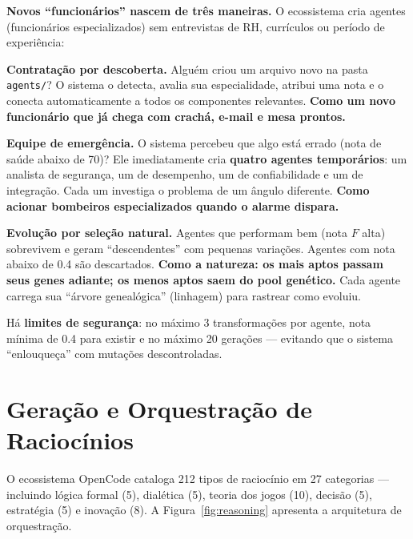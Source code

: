 \documentclass[
  article,
  12pt,
  oneside,
  a4paper,
  brazil,
  sumario=tradicional
]{abntex2}
\begin{document}
\begin{leigosbox}
\textbf{Novos ``funcionários'' nascem de três maneiras.} O ecossistema cria agentes (funcionários especializados) sem entrevistas de RH, currículos ou período de experiência:

\vspace{2pt}
\noindent\textbf{Contratação por descoberta.} Alguém criou um arquivo novo na pasta \texttt{agents/}? O sistema o detecta, avalia sua especialidade, atribui uma nota e o conecta automaticamente a todos os componentes relevantes. \textbf{Como um novo funcionário que já chega com crachá, e-mail e mesa prontos.}

\vspace{2pt}
\noindent\textbf{Equipe de emergência.} O sistema percebeu que algo está errado (nota de saúde abaixo de 70)? Ele imediatamente cria \textbf{quatro agentes temporários}: um analista de segurança, um de desempenho, um de confiabilidade e um de integração. Cada um investiga o problema de um ângulo diferente. \textbf{Como acionar bombeiros especializados quando o alarme dispara.}

\vspace{2pt}
\noindent\textbf{Evolução por seleção natural.} Agentes que performam bem (nota $F$ alta) sobrevivem e geram ``descendentes'' com pequenas variações. Agentes com nota abaixo de 0.4 são descartados. \textbf{Como a natureza: os mais aptos passam seus genes adiante; os menos aptos saem do pool genético.} Cada agente carrega sua ``árvore genealógica'' (linhagem) para rastrear como evoluiu.

\vspace{4pt}
\noindent Há \textbf{limites de segurança}: no máximo 3 transformações por agente, nota mínima de 0.4 para existir e no máximo 20 gerações --- evitando que o sistema ``enlouqueça'' com mutações descontroladas.
\end{leigosbox}

\section{Geração e Orquestração de Raciocínios}

O ecossistema OpenCode cataloga 212 tipos de raciocínio em 27 categorias --- incluindo lógica formal (5), dialética (5), teoria dos jogos (10), decisão (5), estratégia (5) e inovação (8). A Figura~\ref{fig:reasoning} apresenta a arquitetura de orquestração.
\end{document}
